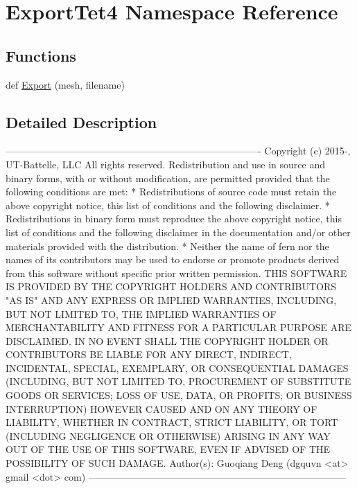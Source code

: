 \hypertarget{a00214}{}\section{Export\+Tet4 Namespace Reference}
\label{a00214}
\subsection*{Functions}
\begin{DoxyCompactItemize}
\item 
def \hyperlink{a00214_aea0f50185b92cacceb8ca208bba2a6ea}{Export} (mesh, filename)
\end{DoxyCompactItemize}


\subsection{Detailed Description}
\begin{DoxyVerb}-------------------------------------------------------------------------------
 Copyright (c) 2015-, UT-Battelle, LLC
 All rights reserved.
 Redistribution and use in source and binary forms, with or without
 modification, are permitted provided that the following conditions are met:
 * Redistributions of source code must retain the above copyright notice, this
 list of conditions and the following disclaimer.
 * Redistributions in binary form must reproduce the above copyright notice,
 this list of conditions and the following disclaimer in the documentation
 and/or other materials provided with the distribution.
 * Neither the name of fern nor the names of its
 contributors may be used to endorse or promote products derived from
 this software without specific prior written permission.
 THIS SOFTWARE IS PROVIDED BY THE COPYRIGHT HOLDERS AND CONTRIBUTORS "AS IS"
 AND ANY EXPRESS OR IMPLIED WARRANTIES, INCLUDING, BUT NOT LIMITED TO, THE
 IMPLIED WARRANTIES OF MERCHANTABILITY AND FITNESS FOR A PARTICULAR PURPOSE ARE
 DISCLAIMED. IN NO EVENT SHALL THE COPYRIGHT HOLDER OR CONTRIBUTORS BE LIABLE
 FOR ANY DIRECT, INDIRECT, INCIDENTAL, SPECIAL, EXEMPLARY, OR CONSEQUENTIAL
 DAMAGES (INCLUDING, BUT NOT LIMITED TO, PROCUREMENT OF SUBSTITUTE GOODS OR
 SERVICES; LOSS OF USE, DATA, OR PROFITS; OR BUSINESS INTERRUPTION) HOWEVER
 CAUSED AND ON ANY THEORY OF LIABILITY, WHETHER IN CONTRACT, STRICT LIABILITY,
 OR TORT (INCLUDING NEGLIGENCE OR OTHERWISE) ARISING IN ANY WAY OUT OF THE USE
 OF THIS SOFTWARE, EVEN IF ADVISED OF THE POSSIBILITY OF SUCH DAMAGE.
 Author(s): Guoqiang Deng (dgquvn <at> gmail <dot> com)
 --------------------------------------------------------------------------------\end{DoxyVerb}
 

